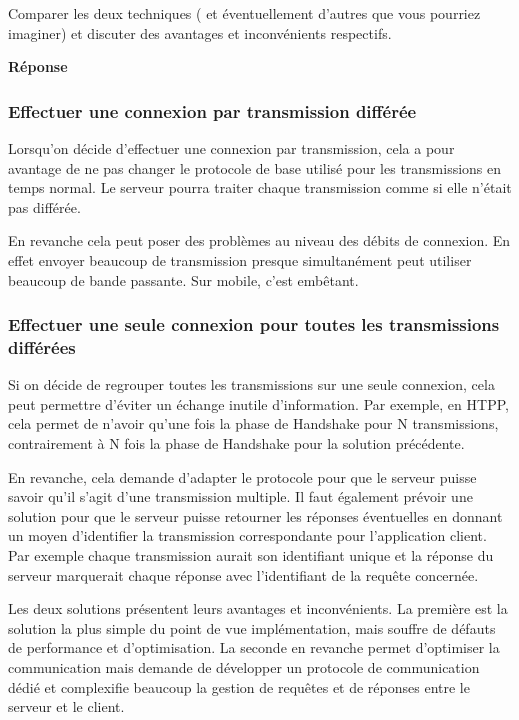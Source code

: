 \documentclass[francais,12pt]{article}
\begin{document}
	Comparer les deux techniques ( et éventuellement d'autres que vous pourriez imaginer) et discuter des avantages et inconvénients respectifs.
	
	{\color[rgb]{0,0.5,0.23}\textbf{Réponse}}
	
	\subsubsection*{Effectuer une connexion par transmission différée}
	Lorsqu'on décide d'effectuer une connexion par transmission, cela a pour avantage de ne pas changer le protocole de base utilisé pour les transmissions en temps normal. Le serveur pourra traiter chaque transmission comme si elle n'était pas différée. 
	
	En revanche cela peut poser des problèmes au niveau des débits de connexion. En effet envoyer beaucoup de transmission presque simultanément peut utiliser beaucoup de bande passante. Sur mobile, c'est embêtant. 
	\subsubsection*{Effectuer une seule connexion pour toutes les transmissions différées}
	Si on décide de regrouper toutes les transmissions sur une seule connexion, cela peut permettre d'éviter un échange inutile d'information. Par exemple, en HTPP, cela permet de n'avoir qu'une fois la phase de Handshake pour N transmissions, contrairement à N fois la phase de Handshake pour la solution précédente. 
	
	En revanche, cela demande d'adapter le protocole pour que le serveur puisse savoir qu'il s'agit d'une transmission multiple. Il faut également prévoir une solution pour que le serveur puisse retourner les réponses éventuelles en donnant un moyen d'identifier la transmission correspondante pour l'application client. Par exemple chaque transmission aurait son identifiant unique et la réponse du serveur marquerait chaque réponse avec l'identifiant de la requête concernée.
	
	Les deux solutions présentent leurs avantages et inconvénients. La première est la solution la plus simple du point de vue implémentation, mais souffre de défauts de performance et d'optimisation. La seconde en revanche permet d'optimiser la communication mais demande de développer un protocole de communication dédié et complexifie beaucoup la gestion de requêtes et de réponses entre le serveur et le client.
	
	
\end{document}
